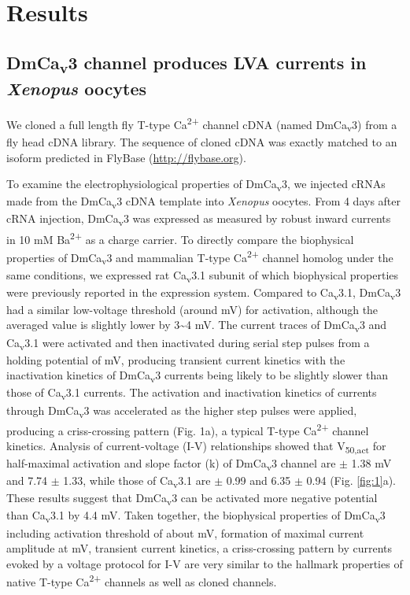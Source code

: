 \section*{Results}

\subsection*{DmCa\textsubscript{v}3 channel produces LVA currents in \emph{Xenopus} oocytes}

We cloned a full length fly T-type Ca\textsuperscript{2+} channel cDNA (named DmCa\textsubscript{v}3) from a fly head cDNA library. 
The sequence of cloned cDNA was exactly matched to an isoform predicted in FlyBase (\href{http://}{http://flybase.org}). 

To examine the electrophysiological properties of DmCa\textsubscript{v}3, we injected cRNAs made from the DmCa\textsubscript{v}3 cDNA template into \emph{Xenopus} oocytes.
From 4 days after cRNA injection, DmCa\textsubscript{v}3 was expressed as measured by robust inward currents in 10 mM Ba\textsuperscript{2+} as a charge carrier.
To directly compare the biophysical properties of DmCa\textsubscript{v}3 and mammalian T-type Ca\textsuperscript{2+} channel homolog under the same conditions, we expressed rat Ca\textsubscript{v}3.1 subunit of which biophysical properties were previously reported in the expression system\cite{9495342}.
Compared to Ca\textsubscript{v}3.1, DmCa\textsubscript{v}3 had a similar low-voltage threshold (around  mV) for activation, although the averaged value is slightly lower by 3\sim 4 mV.
The current traces of DmCa\textsubscript{v}3 and Ca\textsubscript{v}3.1 were activated and then inactivated during serial step pulses from a holding potential of  mV, producing transient current kinetics with the inactivation kinetics of DmCa\textsubscript{v}3 currents being likely to be slightly slower than those of Ca\textsubscript{v}3.1 currents.
The activation and inactivation kinetics of currents through DmCa\textsubscript{v}3 was accelerated as the higher step pulses were applied, producing a criss-crossing pattern (Fig. 1a), a typical T-type Ca\textsuperscript{2+} channel kinetics.
Analysis of current-voltage (I-V) relationships showed that V\textsubscript{50,act} for half-maximal activation and slope factor (k) of DmCa\textsubscript{v}3 channel are  $\pm$ 1.38 mV and 7.74 $\pm$ 1.33, while those of Ca\textsubscript{v}3.1 are  $\pm$ 0.99 and 6.35 $\pm$ 0.94 (Fig. \ref{fig:1}a).
These results suggest that DmCa\textsubscript{v}3 can be activated more negative potential than Ca\textsubscript{v}3.1 by 4.4 mV.
Taken together, the biophysical properties of DmCa\textsubscript{v}3 including activation threshold of about  mV, formation of maximal current amplitude at  mV, transient current kinetics, a criss-crossing pattern by currents evoked by a voltage protocol for I-V are very similar to the hallmark properties of native T-type Ca\textsuperscript{2+} channels as well as cloned channels\cite{9495342, 6087159, 9670923, 10066244}.

